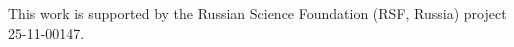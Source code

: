 \documentclass[journal]{IEEEtran}
\begin{document}
\medskip
This work is supported by the Russian Science Foundation (RSF, Russia) 
project 25-11-00147.







% 
% 



\end{document}
